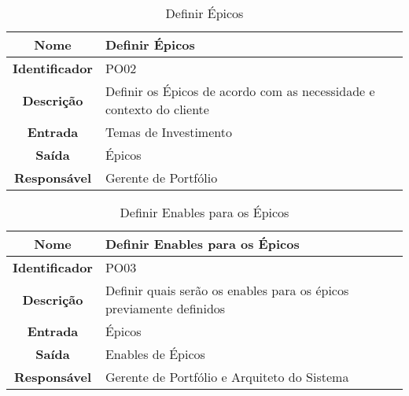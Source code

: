 {          \begin{table}[H]
                \centering
                \caption{Definir Épicos}
                \begin{tabular}{c|p{10cm}}
                    \hline
                    \textbf{Nome}            & Definir Épicos\\
                    \hline
                    \textbf{Identificador} & PO02\\ 
                    \hline
                    \textbf{Descrição}   & Definir os Épicos de acordo com as necessidade e contexto do cliente\\ 
                    \hline
                    \textbf{Entrada}           & Temas de Investimento\\
                    \hline
                    \textbf{Saída}            &  Épicos\\
                    \hline
                    \textbf{Responsável}            & Gerente de Portfólio\\
                    \hline                    
                \end{tabular}
            \end{table}


		 \begin{table}[H]
                \centering
                \caption{Definir Enables para os Épicos}
                \begin{tabular}{c|p{10cm}}
                    \hline
                    \textbf{Nome}            & Definir Enables para os Épicos\\
                    \hline
                    \textbf{Identificador} & PO03\\ 
                    \hline
                    \textbf{Descrição}   & Definir quais serão os enables para os épicos previamente definidos\\ 
                    \hline
                    \textbf{Entrada}           & Épicos\\
                    \hline
                    \textbf{Saída}            &  Enables de Épicos\\
                    \hline
                    \textbf{Responsável}            & Gerente de Portfólio e Arquiteto do Sistema\\
                    \hline                    
                \end{tabular}
            \end{table}

}
